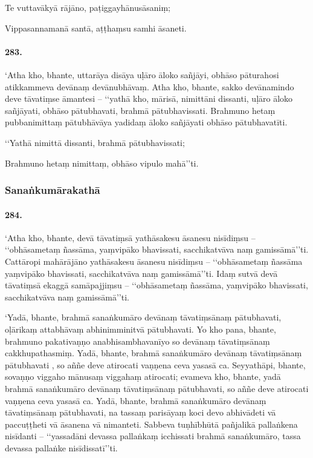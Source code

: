Te vuttavākyā rājāno, paṭiggayhānusāsaniṃ;

Vippasannamanā santā, aṭṭhaṃsu samhi āsaneti.

\paragraph{283.} ‘Atha kho, bhante, uttarāya disāya uḷāro āloko sañjāyi, obhāso pāturahosi atikkammeva devānaṃ devānubhāvaṃ. Atha kho, bhante, sakko devānamindo deve tāvatiṃse āmantesi – ‘‘yathā kho, mārisā, nimittāni dissanti, uḷāro āloko sañjāyati, obhāso pātubhavati, brahmā pātubhavissati. Brahmuno hetaṃ pubbanimittaṃ pātubhāvāya yadidaṃ āloko sañjāyati obhāso pātubhavatīti.

‘‘Yathā nimittā dissanti, brahmā pātubhavissati;

Brahmuno hetaṃ nimittaṃ, obhāso vipulo mahā’’ti.

\subsubsection{Sanaṅkumārakathā}

\paragraph{284.} ‘Atha kho, bhante, devā tāvatiṃsā yathāsakesu āsanesu nisīdiṃsu – ‘‘obhāsametaṃ ñassāma, yaṃvipāko bhavissati, sacchikatvāva naṃ gamissāmā’’ti. Cattāropi mahārājāno yathāsakesu āsanesu nisīdiṃsu – ‘‘obhāsametaṃ ñassāma yaṃvipāko bhavissati, sacchikatvāva naṃ gamissāmā’’ti. Idaṃ sutvā devā tāvatiṃsā ekaggā samāpajjiṃsu – ‘‘obhāsametaṃ ñassāma, yaṃvipāko bhavissati, sacchikatvāva naṃ gamissāmā’’ti.

‘Yadā, bhante, brahmā sanaṅkumāro devānaṃ tāvatiṃsānaṃ pātubhavati, oḷārikaṃ attabhāvaṃ abhinimminitvā pātubhavati. Yo kho pana, bhante, brahmuno pakativaṇṇo anabhisambhavanīyo so devānaṃ tāvatiṃsānaṃ cakkhupathasmiṃ. Yadā, bhante, brahmā sanaṅkumāro devānaṃ tāvatiṃsānaṃ pātubhavati , so aññe deve atirocati vaṇṇena ceva yasasā ca. Seyyathāpi, bhante, sovaṇṇo viggaho mānusaṃ viggahaṃ atirocati; evameva kho, bhante, yadā brahmā sanaṅkumāro devānaṃ tāvatiṃsānaṃ pātubhavati, so aññe deve atirocati vaṇṇena ceva yasasā ca. Yadā, bhante, brahmā sanaṅkumāro devānaṃ tāvatiṃsānaṃ pātubhavati, na tassaṃ parisāyaṃ koci devo abhivādeti vā paccuṭṭheti vā āsanena vā nimanteti. Sabbeva tuṇhībhūtā pañjalikā pallaṅkena nisīdanti – ‘‘yassadāni devassa pallaṅkaṃ icchissati brahmā sanaṅkumāro, tassa devassa pallaṅke nisīdissatī’’ti.

